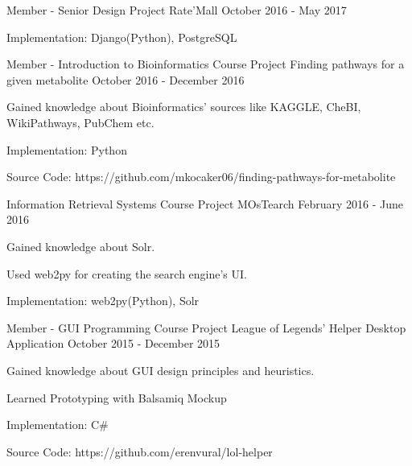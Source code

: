 \begin{cventries}
    \cventry
        {Member - Senior Design Project}
        {Rate'Mall}
        {}
        {October 2016 - May 2017}
        {
            \begin{cvitems}
                \item {Implementation: Django(Python), PostgreSQL}
            \end{cvitems}
        }

    \cventry
        {Member - Introduction to Bioinformatics Course Project}
        {Finding pathways for a given metabolite}
        {}
        {October 2016 - December 2016}
        {
            \begin{cvitems}
                \item {Gained knowledge about Bioinformatics' sources like KAGGLE, CheBI, WikiPathways, PubChem etc.}
                \item {Implementation: Python}
                \item {Source Code: https://github.com/mkocaker06/finding-pathways-for-metabolite}
            \end{cvitems}
        }

    \cventry
        {Information Retrieval Systems Course Project}
        {MOsTearch}
        {}
        {February 2016 - June 2016}
        {
            \begin{cvitems}
                \item {Gained knowledge about Solr.}
                \item {Used web2py for creating the search engine's UI.}
                \item {Implementation: web2py(Python), Solr}
            \end{cvitems}
        }

    \cventry
        {Member - GUI Programming Course Project}
        {League of Legends' Helper Desktop Application}
        {}
        {October 2015 - December 2015}
        {
            \begin{cvitems}
                \item {Gained knowledge about GUI design principles and heuristics.}
                \item {Learned Prototyping with Balsamiq Mockup}
                \item {Implementation: C\#}
                \item {Source Code: https://github.com/erenvural/lol-helper}
            \end{cvitems}
        }


\end{cventries}

